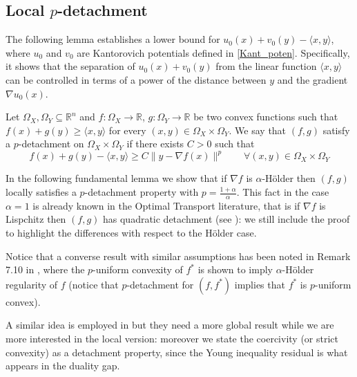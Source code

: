 \documentclass[reqno,12pt]{article}
\newcommand{\R}{\mathbb{R}}
\begin{document}
\subsection{Local $p$-detachment}

The following lemma establishes a lower bound for $u_{0}(x) + v_{0}(y) - \langle x, y \rangle$, where $u_{0}$ and $v_{0}$ are Kantorovich potentials defined in \eqref{Kant_poten}. Specifically, it shows that the separation of $u_{0}(x) + v_{0}(y)$ from the linear function $\langle x, y \rangle$ can be controlled in terms of a power of the distance between $y$ and the gradient $\nabla u_{0}(x)$.

\begin{deff}[$p$-detachment] Let $\Omega_X, \Omega_Y \subseteq \R^n$ and $f: \Omega_X \to \mathbb{R}$, $g:\Omega_Y \to \mathbb{R}$ be two convex functions such that $f(x)+g(y) \geqslant \langle x,y\rangle$ for every $(x,y) \in \Omega_X \times \Omega_Y$. We say that $(f,g)$ satisfy a $p$-detachment on $\Omega_X \times \Omega_Y$ if there exists $C>0$ such that 
$$f(x)+g(y) - \langle x,y \rangle \geqslant C \| y- \nabla f (x)\|^{p} \qquad \forall (x,y) \in \Omega_X \times \Omega_Y$$
\end{deff}
In the following fundamental lemma we show that if $\nabla f$ is $\alpha$-H\"{o}lder then $(f,g)$ locally satisfies a $p$-detachment property with $p= \frac{ 1+\alpha}{\alpha}$. This fact in the case $\alpha=1$ is already known in the Optimal Transport literature, that is if $\nabla f$ is Lispchitz then $(f,g)$ has quadratic detachment (see \cite{ambrosio13,Vil2}): we still include the proof to highlight the differences with respect to the H\"older case.

Notice that a converse result with similar assumptions has been noted in Remark 7.10 in \cite{caffarelli2010free}, where the $p$-uniform convexity of $f^*$ is shown to imply $\alpha$-H\"{o}lder regularity of $f$ (notice that $p$-detachment for $(f,f^*)$ implies that $f^*$ is $p$-uniform convex).

A similar idea is employed in \cite{conforti2024weak, conforti2023quantitative, gozlan2025global} but they need a more global result while we are more interested in the local version: moreover we state the coercivity (or strict convexity) as a detachment property, since the Young inequality residual is what appears in the duality gap.
\end{document}

